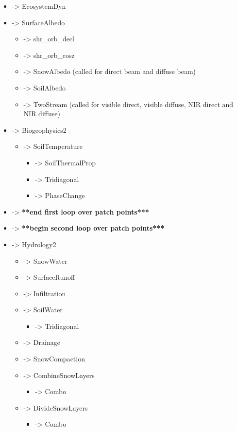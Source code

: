 \documentclass[]{article}
\begin{document}
\begin{itemize}
\begin{itemize}
  \end{itemize}
\item ->  EcosystemDyn 
\item ->  SurfaceAlbedo 
  \begin{itemize}
  \item ->  shr\_orb\_decl 
  \item ->  shr\_orb\_cosz 
  \item ->  SnowAlbedo (called for direct beam and diffuse beam) 
  \item ->  SoilAlbedo 
  \item ->  TwoStream (called for visible direct, visible diffuse, NIR direct and NIR diffuse) 
  \end{itemize}
\item ->  Biogeophysics2 
  \begin{itemize}
  \item ->  SoilTemperature 
    \begin{itemize}
    \item ->  SoilThermalProp 
    \item ->  Tridiagonal 
    \item ->  PhaseChange 
    \end{itemize}
  \end{itemize}
\item -> {\bf ***end first loop over patch points***} 
\item -> {\bf ***begin second loop over patch points***} 
\item ->  Hydrology2 
   \begin{itemize}
   \item ->  SnowWater 
   \item ->  SurfaceRunoff 
   \item ->  Infiltration 
   \item ->  SoilWater 
     \begin{itemize}
     \item -> Tridiagonal 
     \end{itemize}
   \item ->  Drainage 
   \item ->  SnowCompaction 
   \item ->  CombineSnowLayers 
     \begin{itemize}
     \item -> Combo 
     \end{itemize}
   \item ->  DivideSnowLayers 
     \begin{itemize}
     \item -> Combo 

\end{itemize}
\end{itemize}
\end{itemize}
\end{document}
